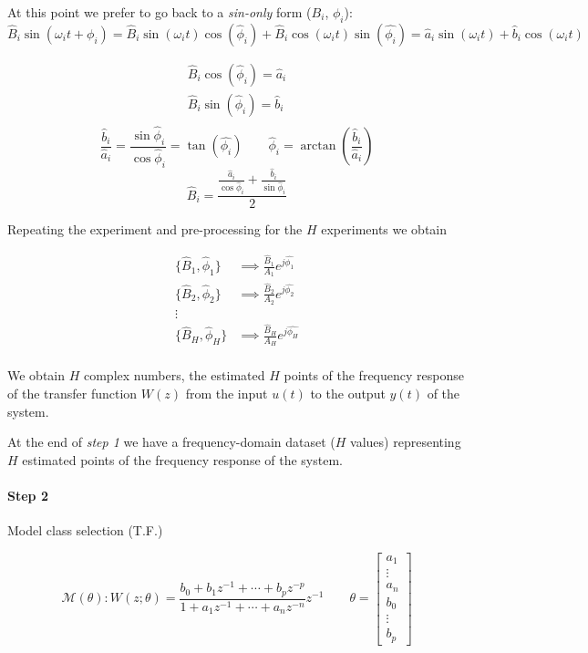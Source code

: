 At this point we prefer to go back to a \emph{sin-only} form ($B_i$, $\phi_i$):
\[
    \hat{B}_i\sin(\omega_it + \phi_i) = \hat{B}_i\sin(\omega_it)\cos(\hat{\phi}_i) + \hat{B}_i\cos(\omega_it)\sin(\hat{\phi_i}) = \hat{a}_i\sin(\omega_it) + \hat{b}_i\cos(\omega_it)
\]

\begin{align*}
    \hat{B}_i\cos(\hat{\phi}_i) = \hat{a}_i \\
    \hat{B}_i\sin(\hat{\phi}_i) = \hat{b}_i \\
\end{align*}
\[
    \frac{\hat{b}_i}{\hat{a}_i} = \frac{\sin\hat{\phi}_i}{\cos{\hat{\phi}_i}} = \tan(\hat{\phi_i}) \qquad \hat{\phi}_i = \arctan \left( \frac{\hat{b}_i}{\hat{a}_i} \right)
\]
\[
    \hat{B}_i = \frac{\frac{\hat{a}_i}{\cos\hat{\phi}_i} + \frac{\hat{b}_i}{\sin\hat{\phi}_i}}{2}
\]

Repeating the experiment and pre-processing for the $H$ experiments we obtain

\begin{align*}
    \{ \hat{B}_1, \hat{\phi}_1 \} &\implies \frac{\hat{B}_1}{A_1} e^{j\hat{\phi_1}} \\
    \{ \hat{B}_2, \hat{\phi}_2 \} &\implies \frac{\hat{B}_2}{A_2} e^{j\hat{\phi_2}} \\
    \vdots& \\
    \{ \hat{B}_H, \hat{\phi}_H \} &\implies \frac{\hat{B}_H}{A_H} e^{j\hat{\phi_H}} \\
\end{align*}

We obtain $H$ complex numbers, the estimated $H$ points of the frequency response of the transfer function $W(z)$ from the input $u(t)$ to the output $y(t)$ of the system.


At the end of \emph{step 1} we have a frequency-domain dataset ($H$ values) representing $H$ estimated points of the frequency response of the system.

\paragraph{Step 2} Model class selection (T.F.)

\[
    \mathcal{M}(\theta): W(z; \theta) = \frac{b_0+b_1z^{-1}+\cdots+b_pz^{-p}}{1+a_1z^{-1}+\cdots+a_nz^{-n}}z^{-1}
    \qquad
    \theta = \begin{bmatrix}
        a_1 \\ \vdots \\ a_n \\ b_0 \\ \vdots \\ b_p
    \end{bmatrix}
\]

